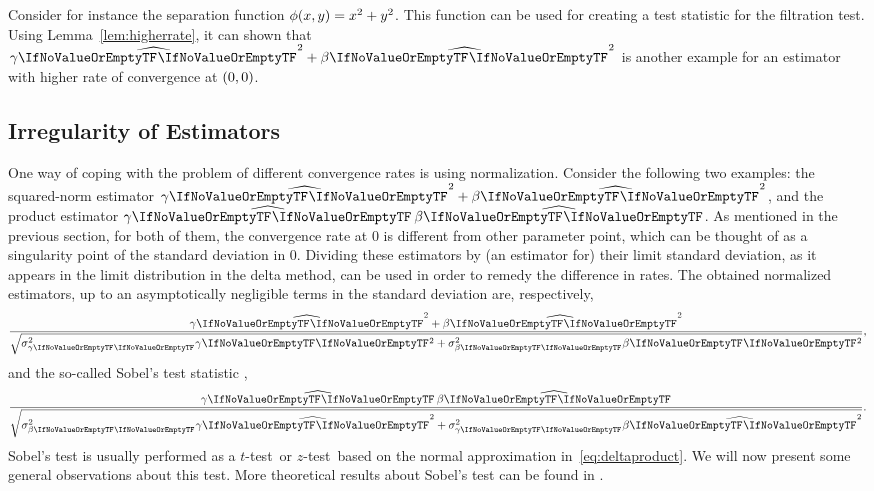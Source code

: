 \documentclass[ejs, twoside]{imsart}
\theoremstyle{plain}
\theoremstyle{remark}
\newcommand{\fullstop}{\text{.}}
\newcommand{\comma}{\text{,}}
\newcommand{\ttest}{\(t\)-test}
\newcommand{\ztest}{\(z\)-test}
\newcommand{\estim}[1]{\widehat{\regcoef{#1}}}
\numberwithin{equation}{section}
\numberwithin{table}{section}
\numberwithin{figure}{section}
\let\originalleft\left
\let\originalright\right
\renewcommand{\left}{\mathopen{}\mathclose\bgroup\originalleft}
\renewcommand{\right}{\aftergroup\egroup\originalright}
\begin{document}
 Consider for instance the separation function \(\phi\left(x,y \right) = x^2 + y^2 \). This function can be used for creating a test statistic for the filtration test. Using Lemma~\ref{lem:higherrate}, it can shown that \( \estim{1}^2 + \estim{2}^2\) is another example for an estimator with higher rate of convergence at \(\left(0,0 \right) \).


	

	
\subsection{Irregularity of Estimators} \label{sec:rates-irreg}

One way of coping with the problem of different convergence rates is using normalization. Consider the following two examples: the squared-norm estimator \( \estim{1}^2 + \estim{2}^2\), and the product estimator \(\product\). As mentioned in the previous section, for both of them, the convergence rate at 0 is different from other parameter point, which can be thought of as a singularity point of the standard deviation in \(0\). Dividing these estimators by (an estimator for) their limit standard deviation, as it appears in the limit distribution in the delta method, can be used in order to remedy the difference in rates.
The obtained normalized estimators, up to an asymptotically negligible terms in the standard deviation are, respectively, \[\frac{ \estim{1}^2 + \estim{2}^2}{\sqrt{\sigma_{\regcoef{1}}^2 \regcoef{1}^2 +  \sigma_{\regcoef{2}}^2 \regcoef{2}^2}} \comma\]
and
the so-called Sobel's test statistic \citep{sobel_asymptotic_1982, mackinnon_comparison_2002, mackinnon_introduction_2012, huang_genome-wide_2019},
\begin{equation} \label{eq:sobel}
\frac{\product}{\sqrt{\sigma_{\regcoef{2}}^2 \estim{1}^2 + \sigma_{\regcoef{1}}^2 \estim{2}^2}} \fullstop
\end{equation}
Sobel's test is usually performed as a \ttest\ or \ztest\, based on the normal approximation in~\eqref{eq:deltaproduct}. We will now present some general observations about this test. More theoretical results about Sobel's test can be found in \citet{liu_large-scale_2022}.
\end{document}
